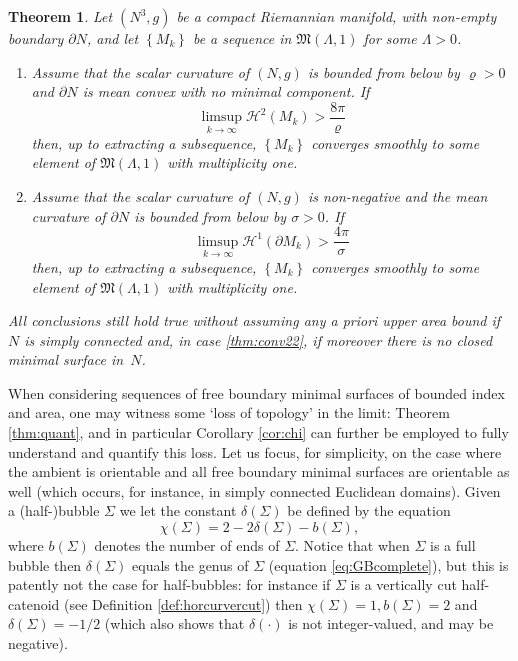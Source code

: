 \documentclass[JEP,XML,SOM,Unicode]{cedram}
\newcounter{cas}
\newtheorem{thm}{Theorem}
\theoremstyle{definition}
\newcommand{\h}{\mathscr{H}}
\begin{document}
\begin{thm}\label{thm:conv2}
Let $(N^3,g)$ be a compact Riemannian manifold, with non-empty boundary $\partial N$, and let $\left\{M_k\right\}$ be a sequence in $\mathfrak{M}(\Lambda,1)$ for some $\Lambda>0$.
\begin{enumerate}
\item \label{thm:conv21}
Assume that the scalar curvature of $(N,g)$ is bounded from below by $\varrho>0$ and $\partial N$ is mean convex with no minimal component. If
\[
\limsup_{k\to\infty}\h^2(M_k)>\frac{8\pi}{\varrho}
\]
then, up to extracting a subsequence, $\left\{M_k\right\}$ converges smoothly to some element of $\mathfrak{M}(\Lambda,1)$ with multiplicity one.
\item \label{thm:conv22}
Assume that the scalar curvature of $(N,g)$ is non-negative and the mean curvature of $\partial N$ is bounded from below by $\sigma>0$. If
\[
\limsup_{k\to\infty}\h^1(\partial M_k)>\frac{4\pi}{\sigma}
\]
then, up to extracting a subsequence, $\left\{M_k\right\}$ converges smoothly to some element of $\mathfrak{M}(\Lambda,1)$ with multiplicity one.
\end{enumerate}
All conclusions still hold true without assuming any a priori upper area bound if $N$ is simply connected and, in case \eqref{thm:conv22}, if moreover there is no \emph{closed} minimal surface in~$N$.
\end{thm}

When considering sequences of free boundary minimal surfaces of bounded index and area, one may witness some `loss of topology' in the limit: Theorem \ref{thm:quant}, and in particular Corollary \ref{cor:chi} can further be employed to fully understand and quantify this loss. Let us focus, for simplicity, on the case where the ambient is orientable and all free boundary minimal surfaces are orientable as well (which occurs, for instance, in simply connected Euclidean domains).
Given a (half-)bubble $\Sigma$ we let the constant $\delta(\Sigma)$ be defined by the equation
\[
\chi(\Sigma)=2-2 \delta(\Sigma)-b(\Sigma),
\]
where $b(\Sigma)$ denotes the number of ends of $\Sigma$. Notice that when $\Sigma$ is a full bubble then $\delta(\Sigma)$ equals the genus of $\Sigma$ (\cf equation \eqref{eq:GBcomplete}), but this is patently not the case for half-bubbles: for instance if $\Sigma$ is a vertically cut half-catenoid (see Definition \ref{def:horcurvercut}) then $\chi(\Sigma)=1, b(\Sigma)=2$ and $\delta(\Sigma)=-1/2$ (which also shows that $\delta(\cdot)$ is not integer-valued, and may be negative).
\end{document}
